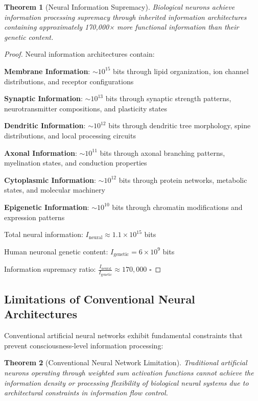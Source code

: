 \documentclass[12pt,a4paper]{article}
\newtheorem{theorem}{Theorem}[section]
\theoremstyle{remark}
\begin{document}
\begin{theorem}[Neural Information Supremacy]
Biological neurons achieve information processing supremacy through inherited information architectures containing approximately 170,000× more functional information than their genetic content.
\end{theorem}

\begin{proof}
Neural information architectures contain:

\textbf{Membrane Information}: $\sim 10^{15}$ bits through lipid organization, ion channel distributions, and receptor configurations

\textbf{Synaptic Information}: $\sim 10^{13}$ bits through synaptic strength patterns, neurotransmitter compositions, and plasticity states

\textbf{Dendritic Information}: $\sim 10^{12}$ bits through dendritic tree morphology, spine distributions, and local processing circuits

\textbf{Axonal Information}: $\sim 10^{11}$ bits through axonal branching patterns, myelination states, and conduction properties

\textbf{Cytoplasmic Information}: $\sim 10^{12}$ bits through protein networks, metabolic states, and molecular machinery

\textbf{Epigenetic Information}: $\sim 10^{10}$ bits through chromatin modifications and expression patterns

Total neural information: $I_{\text{neural}} \approx 1.1 \times 10^{15}$ bits

Human neuronal genetic content: $I_{\text{genetic}} = 6 \times 10^9$ bits

Information supremacy ratio: $\frac{I_{\text{neural}}}{I_{\text{genetic}}} \approx 170,000$ $\square$
\end{proof}

\subsection{Limitations of Conventional Neural Architectures}

Conventional artificial neural networks exhibit fundamental constraints that prevent consciousness-level information processing:

\begin{theorem}[Conventional Neural Network Limitation]
Traditional artificial neurons operating through weighted sum activation functions cannot achieve the information density or processing flexibility of biological neural systems due to architectural constraints in information flow control.
\end{theorem}
\end{document}
